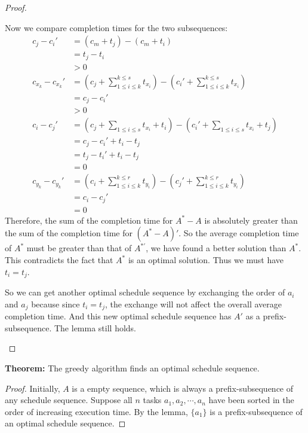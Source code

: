 \documentclass[11pt]{article}
\begin{document}
\begin{enumerate}
\begin{enumerate}
\begin{proof}
\begin{enumerate}
    Now we compare completion times for the two subsequences:
    \begin{align}
      c_j - c_i' &= (c_m + t_j) - (c_m + t_i)\\
      &= t_j - t_i\\
      &> 0\\
      c_{x_k} - c_{x_k}' &= (c_j + \sum_{1 \leq i \leq k}^{k \leq
        s}t_{x_i}) - (c_i' + \sum_{1 \leq i \leq k}^{k \leq
        s}t_{x_i})\\ 
      &= c_j - c_i'\\
      &> 0\\
      c_i - c_j' &= (c_j + \sum_{1 \leq i \leq s}t_{x_i} + t_i) -
      (c_i' + \sum_{1 \leq i \leq s}t_{x_i} + t_j)\\ 
      &= c_j - c_i' + t_i - t_j\\
      &= t_j - t_i' + t_i - t_j\\
      &= 0\\
      c_{y_k} - c_{y_k}' &= (c_i + \sum_{1 \leq i \leq k}^{k \leq
        r}t_{y_i}) - (c_j' + \sum_{1 \leq i \leq k}^{k \leq
        r}t_{y_i})\\
      &= c_i - c_j'\\
      &= 0
    \end{align}
    Therefore, the sum of the completion time for $A^*-A$ is
    absolutely greater than the sum of the completion time for
    $(A^*-A)'$. So the average completion time of $A^*$ must be greater
    than that of $A^{*'}$, we have found a better solution than
    $A^*$. This contradicts the fact that $A^*$ is an optimal
    solution. Thus we must have $t_i = t_j$. 

    So we can get another optimal schedule sequence by exchanging the order of
    $a_i$ and $a_j$ because since $t_i = t_j$, the exchange will not
    affect the overall average completion time. And this new optimal
    schedule sequence has $A'$ as a prefix-subsequence. The lemma
    still holds.
  \end{enumerate}
\end{proof}

\textbf{Theorem:} The greedy algorithm finds an optimal schedule sequence.

\begin{proof}
  Initially, $A$ is a empty sequence, which is always a
  prefix-subsequence of any schedule sequence. Suppose all $n$ tasks
  $a_1,a_2,\cdots,a_n$ have been sorted in the order of increasing
  execution time. By the lemma, $\{a_1\}$ is a prefix-subsequence of
  an optimal schedule sequence. 
  

\end{proof}
\end{enumerate}
\end{enumerate}
\end{document}
